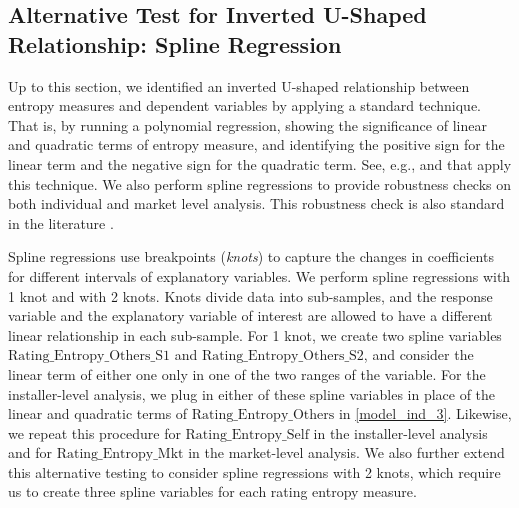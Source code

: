 \documentclass[msom,blindrev]{informs3}
\begin{document}
	
	
	
	\subsection{Alternative Test for Inverted U-Shaped Relationship: Spline Regression}
	
	
	Up to this section, we identified an inverted U-shaped relationship between entropy measures and dependent variables by applying a standard technique. That is, by running a polynomial regression, showing the significance of linear and quadratic terms of entropy measure, and identifying the positive sign for the linear term and the negative sign for the quadratic term. See, e.g., \cite{tan2014does} and \cite{kesavan2014volume} that apply this technique. We also perform spline regressions to provide robustness checks on both individual and market level analysis. This robustness check is also standard in the literature \citep{kesavan2014volume}.
	
	Spline regressions use breakpoints (\emph{knots}) to capture the changes in coefficients for different intervals of explanatory variables. We perform spline regressions with 1 knot and with 2 knots. Knots divide data into sub-samples, and the response variable and the explanatory variable of interest are allowed to have a different linear relationship in each sub-sample. For 1 knot, we create two spline variables $\text{Rating\_Entropy\_Others\_S1}$ and  $\text{Rating\_Entropy\_Others\_S2}$, and consider the linear term of either one only in one of the two ranges of the variable. For the installer-level analysis, we plug in either of these spline variables in place of the linear and quadratic terms of $\text{Rating\_Entropy\_Others}$ in \ref{model_ind_3}.  Likewise, we repeat this procedure for $\text{Rating\_Entropy\_Self}$ in the installer-level analysis and  for $\text{Rating\_Entropy\_Mkt}$ in the market-level analysis. We also further extend this alternative testing to consider spline regressions with 2 knots, which require us to create three spline variables for each rating entropy measure.
	
	
\end{document}

